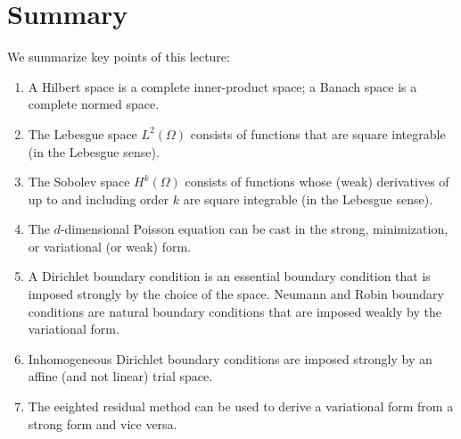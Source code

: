 \section{Summary}
We summarize key points of this lecture:
\begin{enumerate}
\item A Hilbert space is a complete inner-product space; a Banach space is a complete normed space.
\item The Lebesgue space $L^2(\Omega)$ consists of functions that are square integrable (in the Lebesgue sense).
\item The Sobolev space $H^k(\Omega)$ consists of functions whose (weak) derivatives of up to and including order $k$ are square integrable (in the Lebesgue sense).
\item The $d$-dimensional Poisson equation can be cast in the strong, minimization, or variational (or weak) form.
\item A Dirichlet boundary condition is an essential boundary condition that is imposed strongly by the choice of the space.  Neumann and Robin boundary conditions are natural boundary conditions that are imposed weakly by the variational form.
\item Inhomogeneous Dirichlet boundary conditions are imposed strongly by an affine (and not linear) trial space.
\item The eeighted residual method can be used to derive a variational form from a strong form and vice versa. 
\end{enumerate}




